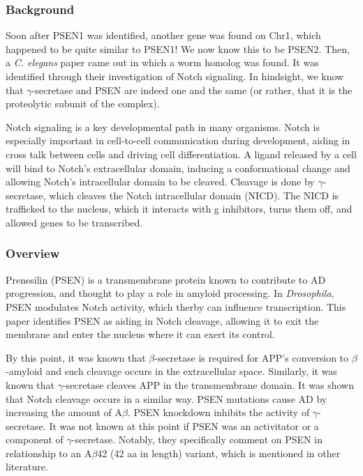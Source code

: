 \documentclass[12pt]{report}
\newcommand{\be}{\beta}
\newcommand{\ga}{\gamma}
\begin{document}
\subsubsection*{Background}

Soon after PSEN1 was identified, another gene was found on Chr1, which happened to be quite similar to PSEN1! We now know this to be PSEN2. Then, a \textit{C. elegans} paper came out in which a worm homolog was found. It was identified through their investigation of Notch signaling. In hindsight, we know that $\ga$-secretase and PSEN are indeed one and the same (or rather, that it is the proteolytic subunit of the complex).\newline

Notch signaling is a key developmental path in many organisms. Notch is especially important in cell-to-cell communication during development, aiding in cross talk between cells and driving cell differentiation. A ligand released by a cell will bind to Notch's extracellular domain, inducing a conformational change and allowing Notch's intracellular domain to be cleaved. Cleavage is done by $\ga$-secretase, which cleaves the Notch intracellular domain (NICD). The NICD is trafficked to the nucleus, which it interacts with g inhibitors, turns them off, and allowed genes to be transcribed. 

\subsubsection*{Overview}

Prenesilin (PSEN) is a transmembrane protein known to contribute to AD progression, and thought to play a role in amyloid processing. In \textit{Drosophila}, PSEN modulates Notch activity, which therby can influence transcription. This paper identifies PSEN as aiding in Notch cleavage, allowing it to exit the membrane and enter the nucleus where it can exert its control.\newline

By this point, it was known that $\beta$-secretase is required for APP's conversion to $\beta$-amyloid and such cleavage occurs in the extracellular space. Similarly, it was known that $\ga$-secretase cleaves APP in the transmembrane domain. It was shown that Notch cleavage occurs in a similar way. PSEN mutations cause AD by increasing the amount of A$\be$. PSEN knockdown inhibits the activity of $\ga$-secretase. It was not known at this point if PSEN was an activitator or a component of $\ga$-secretase. Notably, they specifically comment on PSEN in relationship to an A$\be$42 (42 aa in length) variant, which is mentioned in other literature. 
\end{document}
